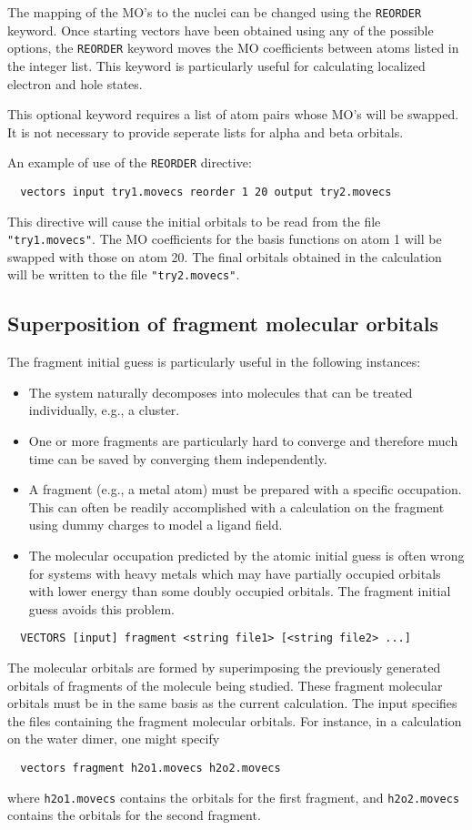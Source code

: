 The mapping of the MO's to the nuclei can be changed using the \verb+REORDER+ keyword.
Once starting vectors have been obtained using any of the possible
options, the \verb+REORDER+ keyword moves the MO coefficients between atoms
listed in the integer list.  This keyword is particularly useful for calculating localized
electron and hole states.

This optional keyword requires a list of atom pairs whose MO's will be
swapped.  It is not necessary to provide seperate lists for alpha and 
beta orbitals. 

An example of use of the \verb+REORDER+ directive:
\begin{verbatim}
  vectors input try1.movecs reorder 1 20 output try2.movecs
\end{verbatim}
This directive will cause the initial orbitals to be read from the
file \verb+"try1.movecs"+.  The MO coefficients for the basis functions
on atom 1 
will be swapped with those on atom 20.
The final orbitals obtained in
the calculation will be written to the file \verb+"try2.movecs"+.

\subsection{Superposition of fragment molecular orbitals}
\label{sec:fragguess}

The fragment initial guess is particularly useful in the following
instances:
\begin{itemize}
\item The system naturally decomposes into molecules that can be
  treated individually, e.g., a cluster.
\item One or more fragments are particularly hard to converge and
  therefore much time can be saved by converging them independently.
\item A fragment (e.g., a metal atom) must be prepared with a specific
  occupation.  This can often be readily accomplished with a
  calculation on the fragment using dummy charges to model a ligand
  field.
\item The molecular occupation predicted by the atomic initial guess
  is often wrong for systems with heavy metals which may have
  partially occupied orbitals with lower energy than some doubly
  occupied orbitals.  The fragment initial guess avoids this problem.
\end{itemize}

\begin{verbatim}
  VECTORS [input] fragment <string file1> [<string file2> ...]
\end{verbatim}
The molecular orbitals are formed by superimposing the previously
generated orbitals of fragments of the molecule being studied.  These
fragment molecular orbitals must be in the same basis as the current
calculation.  The input specifies the files containing the fragment
molecular orbitals.  For instance, in a calculation on the water
dimer, one might specify
\begin{verbatim}
  vectors fragment h2o1.movecs h2o2.movecs
\end{verbatim}
where \verb+h2o1.movecs+ contains the orbitals for the first fragment, and
\verb+h2o2.movecs+ contains the orbitals for the second fragment.

